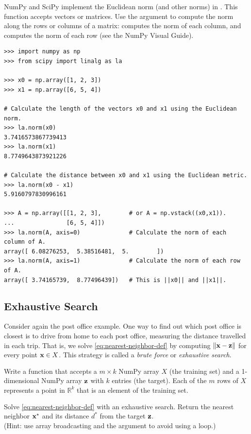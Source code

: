 NumPy and SciPy implement the Euclidean norm (and other norms) in .
This function accepts vectors or matrices.
Use the  argument to compute the norm along the rows or columns of a matrix:  computes the norm of each column, and  computes the norm of each row (see the NumPy Visual Guide).

\begin{lstlisting}
>>> import numpy as np
>>> from scipy import linalg as la

>>> x0 = np.array([1, 2, 3])
>>> x1 = np.array([6, 5, 4])

# Calculate the length of the vectors x0 and x1 using the Euclidean norm.
>>> la.norm(x0)
3.7416573867739413
>>> la.norm(x1)
8.7749643873921226

# Calculate the distance between x0 and x1 using the Euclidean metric.
>>> la.norm(x0 - x1)
5.9160797830996161

>>> A = np.array([[1, 2, 3],        # or A = np.vstack((x0,x1)).
...               [6, 5, 4]])
>>> la.norm(A, axis=0)              # Calculate the norm of each column of A.
array([ 6.08276253,  5.38516481,  5.        ])
>>> la.norm(A, axis=1)              # Calculate the norm of each row of A.
array([ 3.74165739,  8.77496439])   # This is ||x0|| and ||x1||.
\end{lstlisting}

\subsection*{Exhaustive Search} %

Consider again the post office example.
One way to find out which post office is closest is to drive from home to each post office, measuring the distance travelled in each trip.
That is, we solve \eqref{eq:nearest-neighbor-def} by computing $\|\mathbf{x} - \mathbf{z}\|$ for every point $\mathbf{x}\in X$.
This strategy is called a \emph{brute force} or \emph{exhaustive search}.

\begin{problem} %
Write a function that accepts a $m\times k$ NumPy array $X$ (the training set) and a 1-dimensional NumPy array $\mathbf{z}$ with $k$ entries (the target).
Each of the $m$ rows of $X$ represents a point in $\mathbb{R}^k$ that is an element of the training set.

Solve \eqref{eq:nearest-neighbor-def} with an exhaustive search.
Return the nearest neighbor $\mathbf{x}^*$ and its distance $d^*$ from the target $\mathbf{z}$.
\\(Hint: use array broadcasting and the  argument to avoid using a loop.)
\label{prob:nearest-neighbor-exhaustive-search}
\end{problem}

